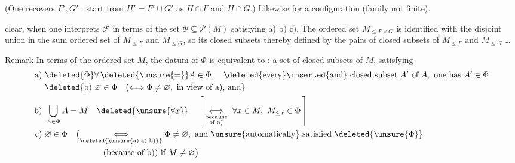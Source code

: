 
(One recovers $F',G'$ : start from $H'=F'\cup G'$ as $H\cap F$ and $H\cap G$.) Likewise for a   configuration (family not  finite). 

  clear, when one interprets $\mathcal F$ in terms of the set $\Phi\subseteq\mathcal P(M)$ satisfying a) b) c). The ordered set $M_{\leq F\vee G}$ is identified with the disjoint union in the sum ordered set of $M_{\leq F}$ and $M_{\leq G}$, so its closed subsets  thereby defined by the pairs of closed subsets of $M_{\leq F}$ and $M_{\leq G}$ \ldots

\uline{Remark}
In terms of the \uline{ordered} set $M$, the datum of $\Phi$ is equivalent to : a set of \uline{closed} subsets of $M$, satisfying
\[
\begin{aligned}
\text{a) }&\deleted{\Phi}\forall\,\deleted{\unsure{=}}A\in\Phi,\quad
 \deleted{\text{every}}\inserted{\text{and}}\ \text{closed subset }A'\text{ of }A,\ \text{one has }A'\in\Phi\\
&\deleted{\text{b) }\varnothing\in\Phi\quad
 (\Longleftrightarrow\Phi\ne\varnothing,\ \text{in view of a), and}}\\
\text{b) }&\bigcup_{A\in\Phi} A=M\quad\deleted{\unsure{\forall x}}\quad
 \left[\,\underset{\substack{\text{because}\\\text{of a)}}}{\Longleftrightarrow}\
 \forall x\in M,\ M_{\leq x}\in\Phi\,\right]\\
\text{c) }&\varnothing\in\Phi\quad
 \bigl(\underset{\deleted{\unsure{\text{a)}|\text{a) b)}}}}{\Longleftrightarrow}
 \Phi\ne\varnothing,\ \text{and \unsure{automatically} satisfied}\ \deleted{\unsure{\Phi}}\\
 &\hspace{7em}\text{(because of b)) if }M\ne\varnothing\bigr)
\end{aligned}
\]

